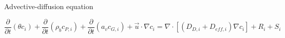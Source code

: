 Advective-diffusion equation

\begin{equation}
  \frac{\partial}{\partial t} (\theta c_i) +
  \frac{\partial}{\partial t} (\rho_b c_{P,i}) +
  \frac{\partial}{\partial t} (a_v c_{G,i}) +
  \vec{u} \cdot \nabla c_i =
  \nabla \cdot [(D_{D,i} + D_{eff,i}) \nabla c_i] +
  R_i + S_i
\end{equation}
